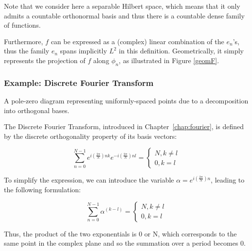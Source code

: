 Note that we consider here a separable Hilbert space, which means that it only admits a countable orthonormal basis and thus there is a countable dense family of functions.

Furthermore, $f$ can be expressed as a (complex) linear combination of the $e_n$'s, thus the family ${e_n}$ spans implicitly $L^2$ in this definition. Geometrically, it simply represents the projection of $f$ along $\phi_n$, as illustrated in Figure \ref{geomF}.

\subsubsection{Example: Discrete Fourier Transform}

\begin{marginfigure}
\centering

\caption{A pole-zero diagram representing uniformly-spaced points due to a decomposition into orthogonal bases.}
\label{circleDiscr} \vspace{3cm}
\end{marginfigure}



The Discrete Fourier Transform, introduced in Chapter~\ref{chap:fourier}, 
is defined by the discrete orthogonality property of its basis vectors:

\begin{equation}
\sum_{n=0}^{N-1} e^{i\left(\frac{2 \pi}{N}\right) n k} e^{-i\left(\frac{2 \pi}{N}\right) n l}=\left\{\begin{array}{c}
N, k \neq l \\
0, k=l
\end{array}\right.
\end{equation}

To simplify the expression, we can introduce the variable $\alpha = e^{i\left(\frac{2 \pi}{N}\right) n}$, leading to the following formulation:

\begin{equation}
\sum_{n=0}^{N-1} \alpha^{(k-l)} =\left\{\begin{array}{c}
N, k \neq l \\
0, k=l
\end{array}\right.
\end{equation}

Thus, the product of the two exponentials is 0 or N, which corresponds to the same point in the complex plane and so the summation over a period becomes 0.


